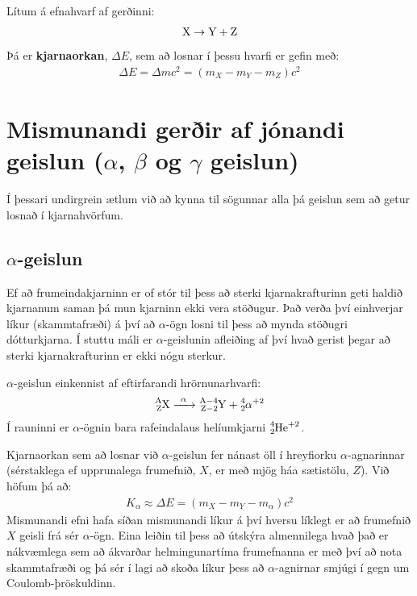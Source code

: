 \begin{tcolorbox}
\begin{definition}
Lítum á efnahvarf af gerðinni:
\begin{align*}
    \ce{X} \to \ce{Y} + \ce{Z}
\end{align*}
Þá er \textbf{kjarnaorkan}, $\Delta E$, sem að losnar í þessu hvarfi er gefin með:
\begin{align*}
    \Delta E = \Delta m c^2 = \left(m_X - m_Y - m_Z\right)c^2
\end{align*}
\end{definition}
\end{tcolorbox}

\section{Mismunandi gerðir af jónandi geislun (\boldmath $\alpha$, \boldmath $\beta$ og \boldmath $\gamma$ geislun)}

Í þessari undirgrein ætlum við að kynna til sögunnar alla þá geislun sem að getur losnað í kjarnahvörfum.

\subsection{\boldmath $\alpha$-geislun}

Ef að frumeindakjarninn er of stór til þess að sterki kjarnakrafturinn geti haldið kjarnanum saman þá mun kjarninn ekki vera stöðugur. Það verða því einhverjar líkur (skammtafræði) á því að $\alpha$-ögn losni til þess að mynda stöðugri dótturkjarna. Í stuttu máli er $\alpha$-geislunin afleiðing af því hvað gerist þegar að sterki kjarnakrafturinn er ekki nógu sterkur.

\begin{tcolorbox}
\begin{definition}
$\alpha$-geislun einkennist af eftirfarandi hrörnunarhvarfi:
\begin{align*}
    \ce{^{A}_{Z}X ->[\alpha] ^{A-4}_{Z-2}Y + ^{4}_{2}\alpha}^{+2}
\end{align*}
Í rauninni er $\alpha$-ögnin bara rafeindalaus helíumkjarni $\ce{^4_2He^{+2}}$.
\end{definition}
\end{tcolorbox}

Kjarnaorkan sem að losnar við $\alpha$-geislun fer nánast öll í hreyfiorku $\alpha$-agnarinnar (sérstaklega ef upprunalega frumefnið, $X$, er með mjög háa sætistölu, $Z$). Við höfum þá að:
\begin{align*}
    K_{\alpha} \approx \Delta E  = \left( m_X - m_Y - m_\alpha \right)c^2
\end{align*}
Mismunandi efni hafa síðan mismunandi líkur á því hversu líklegt er að frumefnið $X$ geisli frá sér $\alpha$-ögn. Eina leiðin til þess að útskýra almennilega hvað það er nákvæmlega sem að ákvarðar helmingunartíma frumefnanna er með því að nota skammtafræði og þá sér í lagi að skoða líkur þess að $\alpha$-agnirnar smjúgi í gegn um Coulomb-þröskuldinn.



